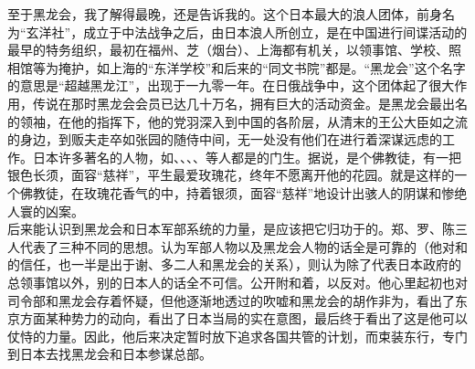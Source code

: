 至于黑龙会，我了解得最晚，还是告诉我的。这个日本最大的浪人团体，前身名为“玄洋社”，成立于中法战争之后，由日本浪人所创立，是在中国进行间谍活动的最早的特务组织，最初在福州、芝（烟台）、上海都有机关，以领事馆、学校、照相馆等为掩护，如上海的“东洋学校”和后来的“同文书院”都是。“黑龙会”这个名字的意思是“超越黑龙江”，出现于一九零一年。在日俄战争中，这个团体起了很大作用，传说在那时黑龙会会员已达几十万名，拥有巨大的活动资金。是黑龙会最出名的领袖，在他的指挥下，他的党羽深入到中国的各阶层，从清末的王公大臣如之流的身边，到贩夫走卒如张园的随侍中间，无一处没有他们在进行着深谋远虑的工作。日本许多著名的人物，如、、、、等人都是的门生。据说，是个佛教徒，有一把银色长须，面容“慈祥”，平生最爱玫瑰花，终年不愿离开他的花园。就是这样的一个佛教徒，在玫瑰花香气的中，持着银须，面容“慈祥”地设计出骇人的阴谋和惨绝人寰的凶案。\\

后来能认识到黑龙会和日本军部系统的力量，是应该把它归功于的。郑、罗、陈三人代表了三种不同的思想。认为军部人物以及黑龙会人物的话全是可靠的（他对和的信任，也一半是出于谢、多二人和黑龙会的关系），则认为除了代表日本政府的总领事馆以外，别的日本人的话全不可信。公开附和着，以反对。他心里起初也对司令部和黑龙会存着怀疑，但他逐渐地透过的吹嘘和黑龙会的胡作非为，看出了东京方面某种势力的动向，看出了日本当局的实在意图，最后终于看出了这是他可以仗恃的力量。因此，他后来决定暂时放下追求各国共管的计划，而束装东行，专门到日本去找黑龙会和日本参谋总部。
